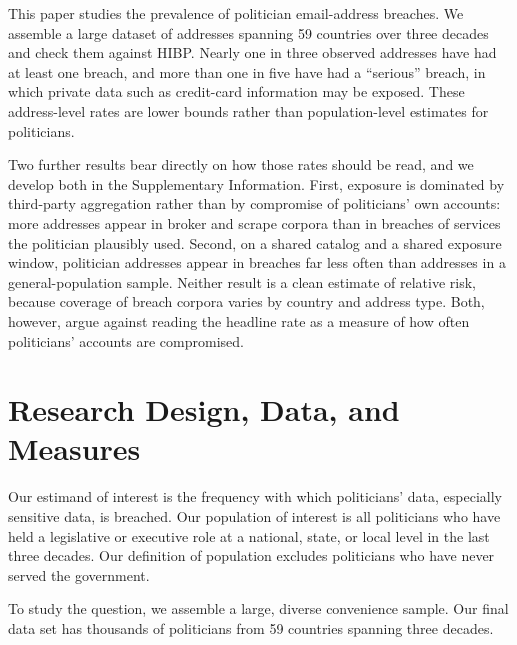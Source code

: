 \documentclass[12pt, letterpaper]{article}
\begin{document}
This paper studies the prevalence of politician email-address breaches. We assemble a large dataset of addresses spanning 59 countries over three decades and check them against HIBP. Nearly one in three observed addresses have had at least one breach, and more than one in five have had a ``serious'' breach, in which private data such as credit-card information may be exposed. These address-level rates are lower bounds rather than population-level estimates for politicians.

Two further results bear directly on how those rates should be read, and we develop both in the Supplementary Information. First, exposure is dominated by third-party aggregation rather than by compromise of politicians' own accounts: more addresses appear in broker and scrape corpora than in breaches of services the politician plausibly used. Second, on a shared catalog and a shared exposure window, politician addresses appear in breaches far less often than addresses in a general-population sample. Neither result is a clean estimate of relative risk, because coverage of breach corpora varies by country and address type. Both, however, argue against reading the headline rate as a measure of how often politicians' accounts are compromised.

\section{Research Design, Data, and Measures}
\label{sec:data}

Our estimand of interest is the frequency with which politicians' data, especially sensitive data, is breached. Our population of interest is all politicians who have held a legislative or executive role at a national, state, or local level in the last three decades. Our definition of population excludes politicians who have never served the government. 

To study the question, we assemble a large, diverse convenience sample. Our final data set has thousands of politicians from 59 countries spanning three decades.
\end{document}
